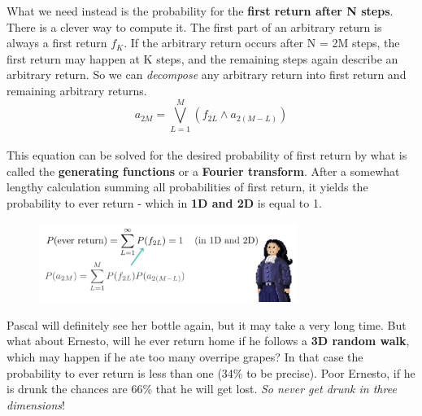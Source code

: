 \documentclass[12pt, a4paper]{scrartcl}
\begin{document}
What we need instead is the probability for the \textbf{first return after N steps}.
There is a clever way to compute it. The first part of an arbitrary return is always a first return $f_K$. If the arbitrary return occurs after N = 2M steps, the first return may happen at K steps, and the remaining steps again describe an arbitrary return.
So we can \textit{decompose} any arbitrary return into first return and remaining arbitrary returns.%
\begin{equation*}\boxed{a_{2M}=\bigvee_{L=1}^{M}(f_{2L}\wedge a_{2(M-L)})
}\end{equation*}\\
This equation can be solved for the desired probability of first return by what is called the \textbf{generating functions} or a \textbf{Fourier transform}. After a somewhat lengthy calculation summing all probabilities of first return, it yields the probability to ever return - which in \textbf{1D and 2D} is equal to 1.%
 \begin{figure}[H]
	\centering
	\includegraphics[width=0.75\textwidth]{5_6.png}
\end{figure}
Pascal will definitely see her bottle again, but it may take a very long time.
But what about Ernesto, will he ever return home if he follows a \textbf{3D random walk}, which may happen if he ate too many overripe grapes?
In that case the probability to ever return is less than one (34\% to be precise).
Poor Ernesto, if he is drunk the chances are 66\% that he will get lost.
\textit{So never get drunk in three dimensions}!\\
\end{document}
